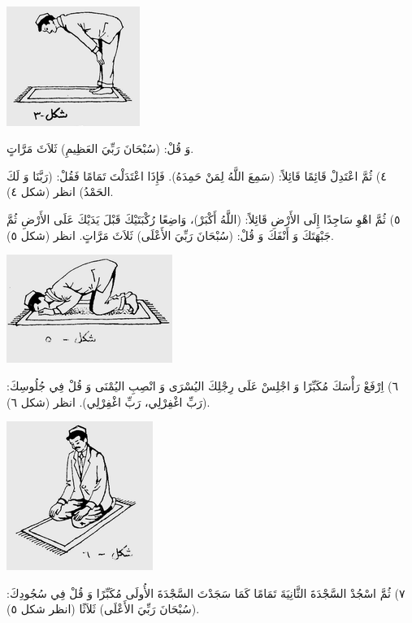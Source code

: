 \documentclass[a5paper]{article}
\begin{document}
\begin{center}
\includegraphics[width=1.7075in,height=1.5283in]{images/MuhammadBagauddinprettified-img346.png}
\end{center}
وَ قُلْ: (سُبْحَانَ رَبِّيَ العَظِيمِ) ثَلاَثَ مَرَّاتٍ.

٤) ثُمَّ اعْتَدِلْ قَائِمًا قَائِلاً: (سَمِعَ اللَّهُ لِمَنْ حَمِدَهُ). فَإِذَا اعْتَدَلْتَ تَمَامًا فَقُلْ: (رَبَّنَا وَ لَكَ الحَمْدُ) انظر (شكل ٤).

٥) ثُمَّ اهْوِ سَاجِدًا إِلَى الأَرْضِ قَائِلاً: (اللَّهُ أَكْبَرْ)، وَاضِعًا رُكْبَتَيْكَ قَبْلَ يَدَيْكَ عَلَى الأَرْضِ ثُمَّ جَبْهَتَكَ وَ أَنْفَكَ وَ قُلْ: (سُبْحَانَ رَبِّيَ الأَعْلَى) ثَلاَثَ مَرَّاتٍ. انظر (شكل ٥).

\begin{center}
\includegraphics[width=2.1228in,height=1.3866in]{images/MuhammadBagauddinprettified-img347.png}
\end{center}
٦) اِرْفَعْ رَأْسَكَ مُكَبِّرًا وَ اجْلِسْ عَلَى رِجْلِكَ اليُسْرَى وَ انْصِبِ اليُمْنَى وَ قُلْ فِي جُلُوسِكَ: (رَبِّ اغْفِرْلِي، رَبِّ اغْفِرْلِي). انظر (شكل ٦).

\begin{center}
\includegraphics[width=1.8772in,height=1.9055in]{images/MuhammadBagauddinprettified-img348.png}
\end{center}
٧) ثُمَّ اسْجُدْ السَّجْدَةَ الثَّانِيَةَ تَمَامًا كَمَا سَجَدْتَ السَّجْدَةَ الأُولَى مُكَبِّرًا وَ قُلْ فِي سُجُودِكَ: (سُبْحَانَ رَبِّيَ الأَعْلَى) ثَلاَثًا (انظر شكل ٥).
\end{document}
